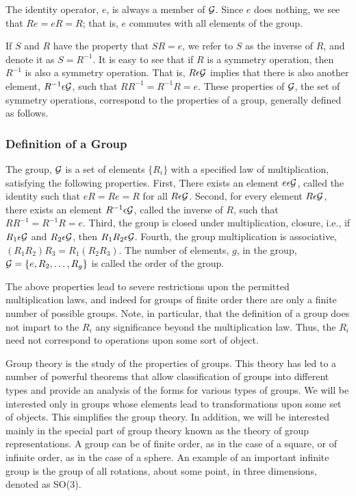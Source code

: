 The identity operator, $e$, is always a member of ${\cal G}$.  Since 
$e$ does nothing, we see that $Re = eR = R$; that is, $e$ commutes 
with all elements of the group.

If $S$ and $R$ have the property that
$S R = e$, we refer to $S$ as the inverse of $R$, and denote it as
$S = R^{-1}$.  It is easy to see that if $R$ is a symmetry operation, 
then $R^{-1}$ is also a symmetry operation.  That is, $R \epsilon 
{\cal G}$ implies 
that there is also another element, $R^{-1} \epsilon {\cal G}$, such that
$R R^{-1} = R^{-1} R = e$.  
These properties of ${\cal G}$, the set of symmetry operations, 
correspond to the properties of a group, generally defined as follows.

\subsubsection{Definition of a Group}

The group, ${\cal G}$ is a set of elements $\{R_i\}$ with a specified 
law of multiplication, satisfying the following properties.  First,
There exists an element $e \epsilon {\cal G}$, called the identity such that
$eR =Re =R$ for all $R \epsilon {\cal G}$.  Second, 
for every element $R \epsilon {\cal G}$, there exists an element 
$R^{-1} \epsilon {\cal G}$, called the inverse of $R$, such that
$RR^{-1} = R^{-1} R = e$.  Third, the group is closed under 
multiplication, closure, i.e., 
if $R_1 \epsilon {\cal G}$ and $R_2 \epsilon {\cal G}$, then $R_1R_2 
\epsilon {\cal G}$.  Fourth, the group multiplication is associative,
$(R_1R_2)R_3 = R_1 (R_2R_3)$.  The number of elements, $g$, in the 
group, ${\cal G} = \{ e , R_2 , \dots , R_g \}$ is 
called the order of the group.

The above properties lead to severe restrictions upon the permitted 
multiplication laws, and indeed for groups of finite order there are 
only a finite number of possible groups.  Note, in particular, that the 
definition of a group does not impart to the $R_i$ any significance 
beyond the multiplication law.  Thus, the $R_i$ need not correspond to 
operations upon some sort of object.
	
Group theory is the study of the properties of groups. This theory
has led to a number of powerful theorems that allow classification of groups
into different types and provide an analysis of the forms for various types
of groups.  We will be interested only in groups whose elements lead to
transformations upon some set of objects. This simplifies the group theory.
In addition, we will be interested mainly in the
special part of group theory known as the theory of group representations.
A group can be of finite order, as in the case of a square, or of infinite
order, as in the case of a sphere. An example of an important infinite
group is the group of all rotations, about some point, in three dimensions,
denoted as SO(3).

